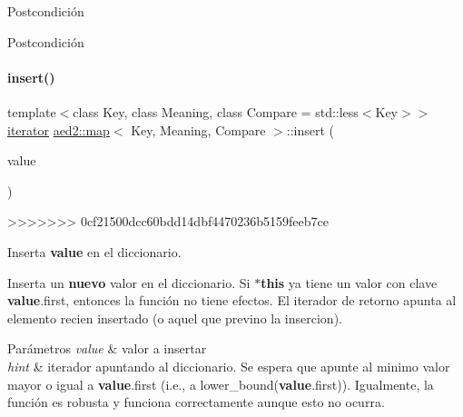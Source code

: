 \begin{DoxyPostcond}{\-Postcondición}
\begin{DoxyPostcond}{\-Postcondición}
\mbox{\label{classaed2_1_1map_a60aacba06b1579630b3c8e996cf248c8_a60aacba06b1579630b3c8e996cf248c8}} 
\paragraph{\texorpdfstring{insert()}{insert()}\hspace{0.1cm}{\footnotesize\ttfamily [1/2]}}
{\footnotesize\ttfamily template$<$class Key, class Meaning, class Compare = std\+::less$<$\+Key$>$$>$ \\
\hyperlink{classaed2_1_1map_1_1iterator}{iterator} \hyperlink{classaed2_1_1map}{aed2\+::map}$<$ Key, Meaning, Compare $>$\+::insert (\begin{DoxyParamCaption}\item[{const \hyperlink{classaed2_1_1map_a719db98e0ff9a837610f76be33264680_a719db98e0ff9a837610f76be33264680}{value\+\_\+type} \&}]{value }\end{DoxyParamCaption})\hspace{0.3cm}{\ttfamily [inline]}}
>>>>>>> 0cf21500dcc60bdd14dbf4470236b5159feeb7ce



Inserta {\bfseries value} en el diccionario. 

Inserta un {\bfseries nuevo} valor en el diccionario. Si {\bfseries $\ast$this} ya tiene un valor con clave {\bfseries value}.first, entonces la función no tiene efectos. El iterador de retorno apunta al elemento recien insertado (o aquel que previno la insercion).


\begin{DoxyParams}{Parámetros}
{\em value} & valor a insertar \\
\hline
{\em hint} & iterador apuntando al diccionario. Se espera que apunte al minimo valor mayor o igual a {\bfseries value}.first (i.\+e., a lower\+\_\+bound({\bfseries value}.first)). Igualmente, la función es robusta y funciona correctamente aunque esto no ocurra. \\
\hline
\end{DoxyParams}


\end{DoxyPostcond}
\end{DoxyPostcond}
